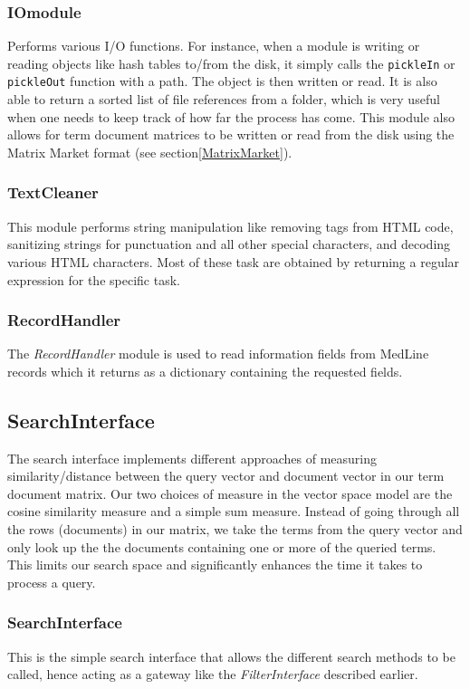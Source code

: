 \subsubsection{IOmodule}
Performs various I/O functions. For instance, when a module is writing
or reading objects like hash tables to/from the disk, it simply calls
the \texttt{pickleIn} or \texttt{pickleOut} function with a path. The
object is then written or read. It is also able to return a sorted
list of file references from a folder, which is very useful when one
needs to keep track of how far the process has come. This module also
allows for term document matrices to be written or read from the disk
using the Matrix Market format (see section\ref{MatrixMarket}).

\subsubsection{TextCleaner}
This module performs string manipulation like removing tags from HTML
code, sanitizing strings for punctuation and all other special
characters, and decoding various HTML characters. Most of these task are
obtained by returning a regular expression for the specific task.

\subsubsection{RecordHandler}
The \textit{RecordHandler} module is used to read information fields
from MedLine records which it returns as a dictionary containing the
requested fields.

\subsection{SearchInterface}
The search interface implements different approaches of measuring
similarity/distance between the query vector and document vector in
our term document matrix. Our two choices of measure in the vector
space model are the cosine similarity measure and a simple sum
measure. Instead of going through all the rows (documents) in our
matrix, we take the terms from the query vector and only look up the 
the documents containing one or more of the queried terms. This limits
our search space and significantly enhances the time it takes to
process a query.

\subsubsection{SearchInterface}
This is the simple search interface that allows the different search
methods to be called, hence acting as a gateway like the
\textit{FilterInterface} described earlier.

